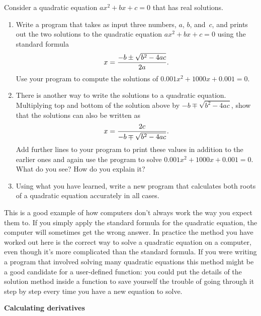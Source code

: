 \documentclass[12pt]{article}
\begin{document}
\begin{exercises}
\smallskip\noindent Consider a quadratic equation $ax^2+bx+c=0$ that has real solutions.
\begin{enumerate}
\item Write a program that takes as input three numbers, $a$, $b$,
  and~$c$, and prints out the two solutions to the quadratic equation
  $ax^2+bx+c=0$ using the standard formula
\begin{displaymath}
x = {-b \pm \sqrt{b^2-4ac}\over2a}.
\end{displaymath}
Use your program to compute the solutions of $0.001 x^2 + 1000 x + 0.001 =
0$.
\item There is another way to write the solutions to a quadratic equation.
  Multiplying top and bottom of the solution above by
  $-b\mp\sqrt{b^2-4ac}$, show that the solutions can also be written as
\begin{displaymath}
x = {2c\over-b\mp\sqrt{b^2-4ac}}.
\end{displaymath}
Add further lines to your program to print these values in addition to the
earlier ones and again use the program to solve $0.001 x^2 + 1000 x + 0.001
= 0$.  What do you see?  How do you explain it?
\item Using what you have learned, write a new program that calculates both
  roots of a quadratic equation accurately in all cases.
\end{enumerate}
This is a good example of how computers don't always work the way you
expect them to.  If you simply apply the standard formula for the quadratic
equation, the computer will sometimes get the wrong answer.  In practice
the method you have worked out here is the correct way to solve a quadratic
equation on a computer, even though it's more complicated than the standard
formula.  If you were writing a program that involved solving many
quadratic equations this method might be a good candidate for a
user-defined function: you could put the details of the solution method
inside a function to save yourself the trouble of going through it step by
step every time you have a new equation to solve.



\newpage
\exercise \textbf{Calculating derivatives}


\end{exercises}
\end{document}
